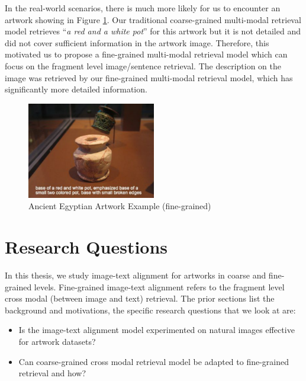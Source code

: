 In the real-world scenarios, there is much more likely for us to encounter an artwork showing in Figure \ref{fig:artwork2}. Our traditional coarse-grained multi-modal retrieval model retrieves ``\textit{a red and a white pot}'' for this artwork but it is not detailed and did not cover sufficient information in the artwork image. Therefore, this motivated us to propose a fine-grained multi-modal retrieval model which can focus on the fragment level image/sentence retrieval. The description on the image was retrieved by our fine-grained multi-modal retrieval model, which has significantly more detailed information.

\begin{figure}[h!]
\centering
\includegraphics[width=0.5\textwidth]{artwork_fine2.pdf}
\caption{Ancient Egyptian Artwork Example (fine-grained)}
\label{fig:artwork2}
\end{figure}

\section{Research Questions}

In this thesis, we study image-text alignment for artworks in coarse and fine-grained levels. Fine-grained image-text alignment refers to the fragment level cross modal (between image and text) retrieval. The prior sections list the background and motivations, the specific research questions that we look at are:

\begin{itemize}
    \item Is the image-text alignment model experimented on natural images effective for artwork datasets?
    \item Can coarse-grained cross modal retrieval model be adapted to fine-grained retrieval and how?
\end{itemize}

